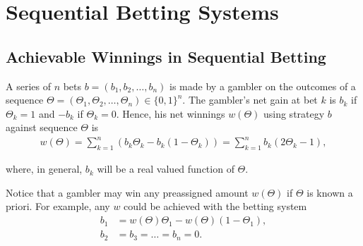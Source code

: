 \documentclass[11pt]{article}
\numberwithin{equation}{section}
\theoremstyle{boldStyle}
\begin{document}
\section{Sequential Betting Systems}

\subsection{Achievable Winnings in Sequential Betting}

A series of \(n\) bets \(b = (b_1, b_2, \ldots, b_n)\) is made by a gambler on the outcomes of a sequence \(\Theta = (\Theta_1, \Theta_2, \ldots, \Theta_n) \in \{0, 1\}^n\).
The gambler's net gain at bet \(k\) is \(b_k\) if \(\Theta_k = 1\) and \(-b_k\) if \(\Theta_k = 0\). Hence, his net winnings \(w(\Theta)\) using strategy \(b\) against sequence \(\Theta\) is
\begin{align} \label{eq:3.1}
    w(\Theta) = \sum_{k=1}^n \left(b_k \Theta_k - b_k(1 - \Theta_k)\right) = \sum_{k=1}^n b_k(2\Theta_k - 1),
\end{align}

where, in general, \(b_k\) will be a real valued function of \(\Theta\).

\medbreak

Notice that a gambler may win any preassigned amount \(w(\Theta)\) if \(\Theta\) is known a priori. For example, any \(w\) could be achieved with the betting system
\begin{equation} \label{eq:3.2}
    \begin{aligned}
        b_1 &= w(\Theta) \Theta_1 - w(\Theta)(1 - \Theta_1), \\
        b_2 &= b_3 = \ldots = b_n = 0.
    \end{aligned}
\end{equation}
\end{document}
